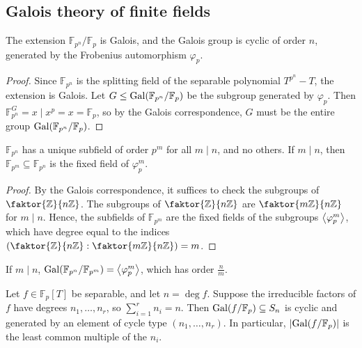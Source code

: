 \subsection{Galois theory of finite fields}
\begin{theorem}
	The extension \( \mathbb F_{p^n} / \mathbb F_p \) is Galois, and the Galois group is cyclic of order \( n \), generated by the Frobenius automorphism \( \varphi_p \).
\end{theorem}
\begin{proof}
	Since \( \mathbb F_{p^n} \) is the splitting field of the separable polynomial \( T^{p^n} - T \), the extension is Galois.
	Let \( G \leq \operatorname{Gal}(\mathbb F_{p^n} / \mathbb F_p) \) be the subgroup generated by \( \varphi_p \).
	Then \( \mathbb F_{p^n}^G = {x \mid x^p = x} = \mathbb F_p \), so by the Galois correspondence, \( G \) must be the entire group \( \operatorname{Gal}(\mathbb F_{p^n} / \mathbb F_p) \).
\end{proof}
\begin{theorem}
	\( \mathbb F_{p^n} \) has a unique subfield of order \( p^m \) for all \( m \mid n \), and no others.
	If \( m \mid n \), then \( \mathbb F_{p^m} \subseteq \mathbb F_{p^n} \) is the fixed field of \( \varphi_p^m \).
\end{theorem}
\begin{proof}
	By the Galois correspondence, it suffices to check the subgroups of \( \faktor{\mathbb Z}{n\mathbb Z} \).
	The subgroups of \( \faktor{\mathbb Z}{n\mathbb Z} \) are \( \faktor{m\mathbb Z}{n\mathbb Z} \) for \( m \mid n \).
	Hence, the subfields of \( \mathbb F_{p^m} \) are the fixed fields of the subgroups \( \left\langle{} \varphi_p^m \right\rangle \), which have degree equal to the indices \( (\faktor{\mathbb Z}{n\mathbb Z} : \faktor{m\mathbb Z}{n\mathbb Z}) = m \).
\end{proof}
\begin{remark}
	If \( m \mid n \), \( \operatorname{Gal}(\mathbb F_{p^n} / \mathbb F_{p^m}) = \left\langle{} \varphi_p^m \right\rangle \), which has order \( \frac{n}{m} \).
\end{remark}
\begin{theorem}
	Let \( f \in \mathbb F_p[T] \) be separable, and let \( n = \deg f \).
	Suppose the irreducible factors of \( f \) have degrees \( n_1, \dots, n_r \), so \( \sum_{i=1}^r n_i = n \).
	Then \( \operatorname{Gal}(f/\mathbb F_p) \subseteq S_n \) is cyclic and generated by an element of cycle type \( (n_1, \dots, n_r) \).
	In particular, \( \lvert\operatorname{Gal}(f/\mathbb F_p)\rvert \) is the least common multiple of the \( n_i \).
\end{theorem}
